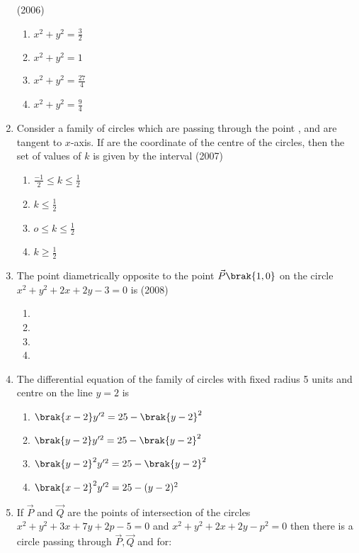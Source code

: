 \begin{enumerate}
\hfill{(2006)}
\begin{multicols}{2}
\begin{enumerate}
\item $x^2+y^2=\frac{3}{2}$
\item $x^2+y^2=1$
\item $x^2+y^2=\frac{27}{4}$
\item $x^2+y^2=\frac{9}{4}$
\end{enumerate}
\end{multicols}
\item Consider a family of circles which are passing through the point , and are tangent to $x$-axis. If  are the coordinate of the centre of the circles, then the set of values of $k$ is given by the interval
\hfill{(2007)}
\begin{multicols}{2}
\begin{enumerate}
\item $\frac{-1}{2} \le k \le \frac{1}{2}$
\item $k \le \frac{1}{2}$
\item $o \le k \le \frac{1}{2}$
\item $k \ge \frac{1}{2}$
\end{enumerate}
\end{multicols}
\item The point diametrically opposite to the point $\vec{P}\brak{1,0}$ on the circle $x^2+y^2+2x+2y-3=0$ is 
\hfill{(2008)}
\begin{multicols}{2}
\begin{enumerate}
\item {}
\item {}
\item {}
\item {}
\end{enumerate}
\end{multicols}
\item The differential equation of the family of circles with fixed radius 5 units and centre on the line $y=2$ is
\begin{enumerate}
\item $\brak{x-2}y^{\prime 2}=25-\brak{y-2}^2$
\item $\brak{y-2}y^{\prime 2}=25-\brak{y-2}^2$
\item $\brak{y-2}^2y^{\prime 2}=25-\brak{y-2}^2$
\item $\brak{x-2}^2y^{\prime 2}=25-(y-2)^2$
\end{enumerate}
\item If $\vec{P}$ and $\vec{Q}$ are the points of intersection of the circles $x^2+y^2+3x+7y+2p-5=0$ and $x^2+y^2+2x+2y-p^2=0$ then there is a circle passing through $\vec{P}, \vec{Q}$ and  for:

\end{enumerate}
